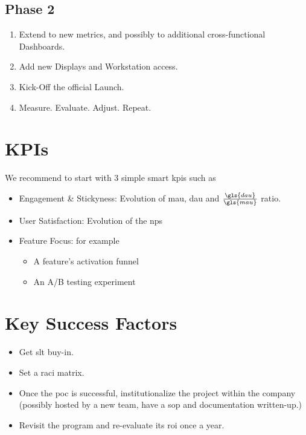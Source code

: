 \documentclass{tufte-handout}
\begin{document}
\subsection{Phase 2}
\begin{enumerate}
  \item Extend to new metrics, and possibly to additional cross-functional Dashboards.
  \item Add new Displays and Workstation access.
  \item Kick-Off the official Launch.
  \item Measure. Evaluate. Adjust. Repeat.
\end{enumerate}

\section{KPIs}\label{KPIs}
We recommend to start with 3 simple \gls{smart} \gls{kpi}s such as
\begin{itemize}
\item Engagement \& Stickyness: Evolution of \gls{mau}, \gls{dau} and $\frac{\gls{dau}}{\gls{mau}}$ ratio.
  \item User Satisfaction: Evolution of the \gls{nps}
  \item Feature Focus: for example
    \begin{itemize}
      \item A feature's activation funnel
      \item An A/B testing experiment
    \end{itemize}
\end{itemize}

\section{Key Success Factors}\label{key-success-factors}
\begin{itemize}
  \item Get \gls{slt} buy-in.
  \item Set a \gls{raci} matrix.
  \item Once the \gls{poc} is successful, institutionalize the project within the company (possibly hosted by a new team, have a \gls{sop} and documentation written-up.)
  \item Revisit the program and re-evaluate its \gls{roi} once a year.
\end{itemize}
\end{document}
